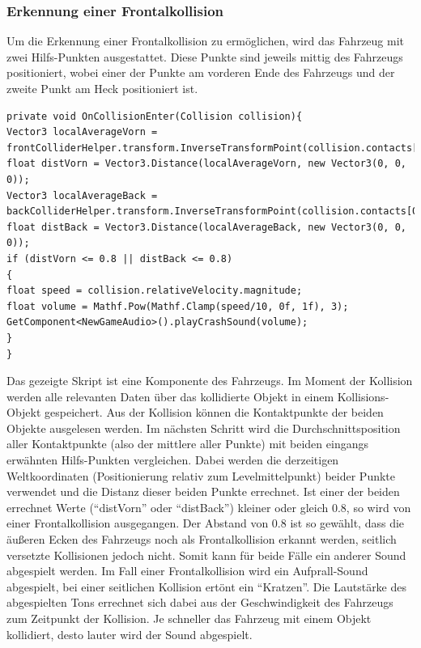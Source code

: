	\subsubsection{Erkennung einer Frontalkollision}
	Um die Erkennung einer Frontalkollision zu ermöglichen, wird das Fahrzeug mit zwei Hilfs-Punkten ausgestattet. Diese Punkte sind jeweils mittig des Fahrzeugs positioniert, wobei einer der Punkte am vorderen Ende des Fahrzeugs und der zweite Punkt am Heck positioniert ist.
	\begin{lstlisting}
private void OnCollisionEnter(Collision collision){
Vector3 localAverageVorn = frontColliderHelper.transform.InverseTransformPoint(collision.contacts[0].point);
float distVorn = Vector3.Distance(localAverageVorn, new Vector3(0, 0, 0));
Vector3 localAverageBack = backColliderHelper.transform.InverseTransformPoint(collision.contacts[0].point);
float distBack = Vector3.Distance(localAverageBack, new Vector3(0, 0, 0));
if (distVorn <= 0.8 || distBack <= 0.8)
{
float speed = collision.relativeVelocity.magnitude;
float volume = Mathf.Pow(Mathf.Clamp(speed/10, 0f, 1f), 3);
GetComponent<NewGameAudio>().playCrashSound(volume);
}
}
\end{lstlisting}
	Das gezeigte Skript ist eine Komponente des Fahrzeugs. Im Moment der Kollision werden alle relevanten Daten über das kollidierte Objekt in einem Kollisions-Objekt gespeichert. Aus der Kollision können die Kontaktpunkte der beiden Objekte ausgelesen werden. Im nächsten Schritt wird die Durchschnittsposition aller Kontaktpunkte (also der mittlere aller Punkte) mit beiden eingangs erwähnten Hilfs-Punkten vergleichen. Dabei werden die derzeitigen Weltkoordinaten (Positionierung relativ zum Levelmittelpunkt) beider Punkte verwendet und die Distanz dieser beiden Punkte errechnet. Ist einer der beiden errechnet Werte (\enquote{distVorn} oder \enquote{distBack}) kleiner oder gleich 0.8, so wird von einer Frontalkollision ausgegangen. Der Abstand von 0.8 ist so gewählt, dass die äußeren Ecken des Fahrzeugs noch als Frontalkollision erkannt werden, seitlich versetzte Kollisionen jedoch nicht. Somit kann für beide Fälle ein anderer Sound abgespielt werden. Im Fall einer Frontalkollision wird ein Aufprall-Sound abgespielt, bei einer seitlichen Kollision ertönt ein \enquote{Kratzen}.
	Die Lautstärke des abgespielten Tons errechnet sich dabei aus der Geschwindigkeit des Fahrzeugs zum Zeitpunkt der Kollision. Je schneller das Fahrzeug mit einem Objekt kollidiert, desto lauter wird der Sound abgespielt.

